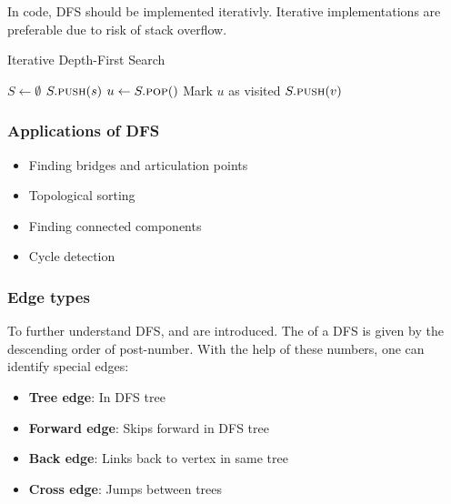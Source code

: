 \documentclass[a3paper, landscape, 11pt]{article} %
\begin{document}
\begin{multicols*}{4}
In code, DFS should be implemented iterativly. Iterative implementations are preferable due to risk of stack overflow.

\begin{algorithm}[H]
\caption{Iterative Depth-First Search}
\begin{algorithmic}[1]
\State $S \gets \emptyset$ 
\State $S.\textsc{push}(s)$
\State $u \gets S.\textsc{pop}()$
\State Mark $u$ as visited
\State $S.\textsc{push}(v)$
\EndFor
\EndIf
\EndWhile
\EndProcedure
\end{algorithmic}
\end{algorithm}

\subsubsection*{Applications of DFS}
\begin{itemize}[noitemsep, label=-]
  \item Finding bridges and articulation points
  \item Topological sorting
  \item Finding connected components
  \item Cycle detection
\end{itemize}
\subsubsection*{Edge types}

To further understand DFS,  and  are introduced. The  of a DFS is given by the descending order of post-number. With the help of these numbers, one can identify special edges:
\begin{itemize}[noitemsep]
	\item \colorbox{green!30}{\textbf{Tree edge}}: In DFS tree
	\item \colorbox{blue!30}{\textbf{Forward edge}}: Skips forward in DFS tree
	\item \colorbox{violet!30}{\textbf{Back edge}}: Links back to vertex in same tree
	\item \colorbox{orange!30}{\textbf{Cross edge}}: Jumps between trees
\end{itemize}


\end{multicols*}
\end{document}

